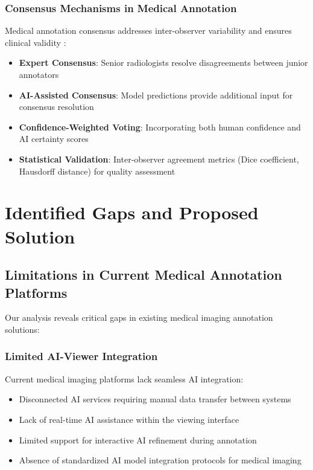\subsubsection{Consensus Mechanisms in Medical Annotation}

Medical annotation consensus addresses inter-observer variability and ensures clinical validity \cite{sheng2008get}:

\begin{itemize}
    \item \textbf{Expert Consensus}: Senior radiologists resolve disagreements between junior annotators
    \item \textbf{AI-Assisted Consensus}: Model predictions provide additional input for consensus resolution
    \item \textbf{Confidence-Weighted Voting}: Incorporating both human confidence and AI certainty scores
    \item \textbf{Statistical Validation}: Inter-observer agreement metrics (Dice coefficient, Hausdorff distance) for quality assessment
\end{itemize}

\section{Identified Gaps and Proposed Solution}
\label{sec:problems-approach}

\subsection{Limitations in Current Medical Annotation Platforms}

Our analysis reveals critical gaps in existing medical imaging annotation solutions:

\subsubsection{Limited AI-Viewer Integration}

Current medical imaging platforms lack seamless AI integration:

\begin{itemize}
    \item Disconnected AI services requiring manual data transfer between systems
    \item Lack of real-time AI assistance within the viewing interface
    \item Limited support for interactive AI refinement during annotation
    \item Absence of standardized AI model integration protocols for medical imaging
\end{itemize}

